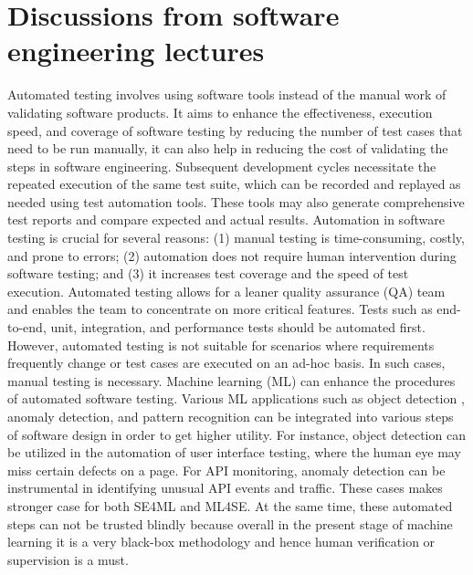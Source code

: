 \documentclass{article}
\begin{document}
\section{Discussions from software engineering lectures}

Automated testing involves using software tools instead of the manual work of validating software products. It aims to enhance the effectiveness, execution speed, and coverage of software testing by reducing the number of test cases that need to be run manually, it can also help in reducing the cost of validating the steps in software engineering. Subsequent development cycles necessitate the repeated execution of the same test suite, which can be recorded and replayed as needed using test automation tools. These tools may also generate comprehensive test reports and compare expected and actual results. Automation in software testing is crucial for several reasons: (1) manual testing is time-consuming, costly, and prone to errors; (2) automation does not require human intervention during software testing; and (3) it increases test coverage and the speed of test execution. Automated testing allows for a leaner quality assurance (QA) team and enables the team to concentrate on more critical features. Tests such as end-to-end, unit, integration, and performance tests should be automated first. However, automated testing is not suitable for scenarios where requirements frequently change or test cases are executed on an ad-hoc basis. In such cases, manual testing is necessary. Machine learning (ML) can enhance the procedures of automated software testing. Various ML applications such as object detection , anomaly detection, and pattern recognition can be integrated into various steps of software design in order to get higher utility. For instance, object detection can be utilized in the automation of user interface testing, where the human eye may miss certain defects on a page. For API monitoring, anomaly detection can be instrumental in identifying unusual API events and traffic. These cases makes stronger case for both SE4ML and ML4SE. At the same time, these automated steps can not be trusted blindly because overall in the present stage of machine learning it is a very black-box methodology and hence human verification or supervision is a must.
\end{document}
